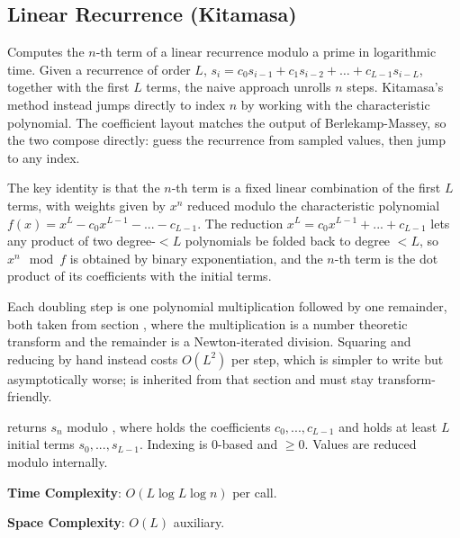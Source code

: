 \subsection{Linear Recurrence (Kitamasa)}
\label{sec:6.6.6}
Computes the $n$-th term of a linear recurrence modulo a prime in logarithmic time. Given a recurrence of order $L$, $s_i = c_0 s_{i-1} + c_1 s_{i-2} + \ldots + c_{L-1} s_{i-L}$, together with the first $L$ terms, the naive approach unrolls $n$ steps. Kitamasa's method instead jumps directly to index $n$ by working with the characteristic polynomial. The coefficient layout matches the output of Berlekamp-Massey, so the two compose directly: guess the recurrence from sampled values, then jump to any index.

The key identity is that the $n$-th term is a fixed linear combination of the first $L$ terms, with weights given by $x^n$ reduced modulo the characteristic polynomial $f(x) = x^L - c_0 x^{L-1} - ... - c_{L-1}$. The reduction $x^L = c_0 x^{L-1} + ... + c_{L-1}$ lets any product of two degree-$<L$ polynomials be folded back to degree $<L$, so $x^n \mod f$ is obtained by binary exponentiation, and the $n$-th term is the dot product of its coefficients with the initial terms.

Each doubling step is one polynomial multiplication followed by one remainder, both taken from section , where the multiplication is a number theoretic transform and the remainder is a Newton-iterated division. Squaring and reducing by hand instead costs $O(L^{2})$ per step, which is simpler to write but asymptotically worse;  is inherited from that section and must stay transform-friendly.

\begin{compactitem}
  \item {} returns $s_n$ modulo , where  holds the coefficients $c_0, ..., c_{L-1}$ and  holds at least $L$ initial terms $s_0, ..., s_{L-1}$. Indexing is 0-based and  $\geq 0$. Values are reduced modulo  internally.
\end{compactitem}

\textbf{Time Complexity}: $O(L \log L \log n)$ per call.

\textbf{Space Complexity}: $O(L)$ auxiliary.

